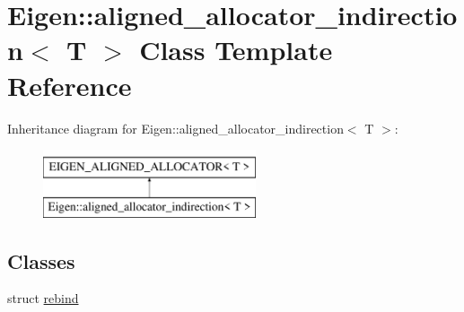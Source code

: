 \hypertarget{class_eigen_1_1aligned__allocator__indirection}{}\section{Eigen\+::aligned\+\_\+allocator\+\_\+indirection$<$ T $>$ Class Template Reference}
\label{class_eigen_1_1aligned__allocator__indirection}
Inheritance diagram for Eigen\+::aligned\+\_\+allocator\+\_\+indirection$<$ T $>$\+:\begin{figure}[H]
\begin{center}
\leavevmode
\includegraphics[height=2.000000cm]{class_eigen_1_1aligned__allocator__indirection}
\end{center}
\end{figure}
\subsection*{Classes}
\begin{DoxyCompactItemize}
\item 
struct \mbox{\hyperlink{struct_eigen_1_1aligned__allocator__indirection_1_1rebind}{rebind}}
\end{DoxyCompactItemize}
